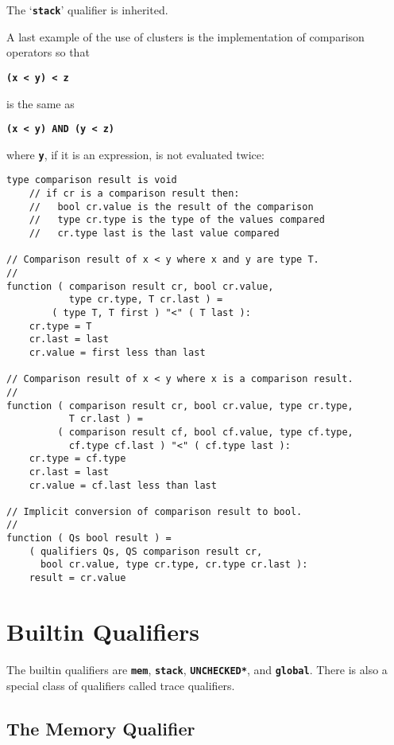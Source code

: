\documentclass[12pt]{article}
\newcommand{\TT}[1]{{\tt \bfseries #1}}
\newenvironment{indpar}[1][0.3in]%
	{\begin{list}{}%
		     {\setlength{\itemsep}{0in}%
		      \setlength{\topsep}{0in}%
		      \setlength{\parsep}{1ex}%
		      \setlength{\labelwidth}{#1}%
		      \setlength{\leftmargin}{#1}%
		      \addtolength{\leftmargin}{\labelsep}}%
	 \item}%
	{\end{list}}
\begin{document}
The `\TT{stack}' qualifier is inherited.

A last example of the use of clusters is the implementation of
comparison operators so that
\begin{center}
\TT{(x~<~y)~<~z}
\end{center}
is the same as
\begin{center}
\TT{(x~<~y) AND (y~<~z)}
\end{center}
where \TT{y}, if it is an expression,
is not evaluated twice:\label{COMPARISON-RESULTS}
\begin{indpar}\begin{verbatim}
type comparison result is void
    // if cr is a comparison result then:
    //   bool cr.value is the result of the comparison
    //   type cr.type is the type of the values compared
    //   cr.type last is the last value compared

// Comparison result of x < y where x and y are type T.
//
function ( comparison result cr, bool cr.value,
           type cr.type, T cr.last ) =
        ( type T, T first ) "<" ( T last ):
    cr.type = T
    cr.last = last
    cr.value = first less than last

// Comparison result of x < y where x is a comparison result.
//
function ( comparison result cr, bool cr.value, type cr.type,
           T cr.last ) =
         ( comparison result cf, bool cf.value, type cf.type,
           cf.type cf.last ) "<" ( cf.type last ):
    cr.type = cf.type
    cr.last = last
    cr.value = cf.last less than last

// Implicit conversion of comparison result to bool.
//
function ( Qs bool result ) =
    ( qualifiers Qs, QS comparison result cr,
      bool cr.value, type cr.type, cr.type cr.last ):
    result = cr.value
\end{verbatim}\end{indpar}

\section{Builtin Qualifiers}
\label{BUILTIN-QUALIFIERS}

The builtin qualifiers are \TT{mem}, \TT{stack}, \TT{*UNCHECKED*},
and \TT{global}.
There is also a special class of qualifiers called trace qualifiers.

\subsection{The Memory Qualifier}
\label{THE-MEM-QUALIFIER}
\end{document}
